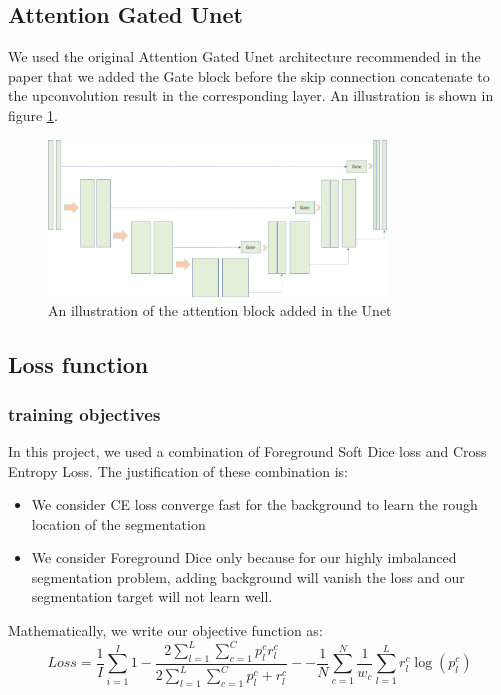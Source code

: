 \subsection{Attention Gated Unet}
We used the original Attention Gated Unet architecture recommended in the paper \cite{??} that we added the Gate block before the skip connection concatenate to the upconvolution result in the corresponding layer.
An illustration is shown in figure \ref{fig:attention_gate}.
\begin{figure}
	\centering
	\includegraphics[width=0.8\textwidth]{img/Net_arch/attention_gate}
	\caption{An illustration of the attention block added in the Unet}	
	\label{fig:attention_gate}
\end{figure}

\subsection{Loss function}
\subsubsection{training objectives}
In this project, we used a combination of Foreground Soft Dice loss and Cross Entropy Loss. The justification of these combination is:
\begin{itemize}
	\item We consider CE loss converge fast for the background to learn the rough location of the segmentation
	\item We consider Foreground Dice only because for our highly imbalanced segmentation problem, adding background will vanish the loss and our segmentation target will not learn well.
\end{itemize}
Mathematically, we write our objective function as:
$$Loss=\frac{1}{I} \sum_{i=1}^{I} 1-\frac{2 \sum_{l=1}^{L} \sum_{c=1}^{C} p_{l}^{c} r_{l}^{c}}{2 \sum_{l=1}^{L} \sum_{c=1}^{C} p_{l}^{c}+r_{l}^{c}} - -\frac{1}{N} \sum_{c=1}^{N} \frac{1}{w_{c}} \sum_{l=1}^{L} r_{l}^{c} \log \left(p_{l}^{c}\right)$$

